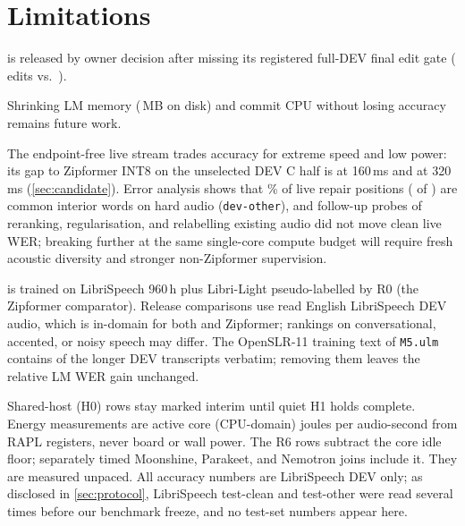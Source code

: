 \section{Limitations}\label{sec:limitations}

 \ultra{} \ReleaseVer{} is released by owner decision after missing its registered
full-DEV final edit gate (\CandFinalFullEdits{} edits vs.\ \CandGateFinalFull).

 \ColdLimitLive{} Shrinking LM memory
(\LmPackMb\,MB on disk) and commit CPU without losing accuracy remains future work.

 The endpoint-free live stream trades accuracy for extreme speed and
low power: its gap to Zipformer INT8 on the unselected DEV C half is \CandLiveLmCDelta\pp at 160\,ms
and \CandLiveLmEightCDelta\pp at 320\,ms (\cref{sec:candidate}). Error analysis shows that \VfDiagInteriorPct\%
of live repair positions (\VfDiagInterior{} of \VfDiagPositions{}) are common interior words on hard audio
(\texttt{dev-other}), and follow-up probes of reranking, regularisation, and relabelling existing audio
did not move clean live WER; breaking further at the same single-core compute budget will require fresh
acoustic diversity and stronger non-Zipformer supervision.

 \ultra{} is trained on LibriSpeech 960\,h plus Libri-Light
pseudo-labelled by R0 (the Zipformer comparator). Release comparisons use read English LibriSpeech DEV
audio, which is in-domain for both \ultra{} and Zipformer; rankings on conversational, accented, or
noisy speech may differ. The OpenSLR-11 training text of \texttt{M5.ulm} contains \LmOverlapCount{} of
the \LmOverlapOf{} longer DEV transcripts verbatim; removing them leaves the relative LM WER gain
unchanged.

 \ColdHostSentence{} \ColdSubsetSentence{}
Shared-host (H0) rows stay marked interim until quiet H1 holds complete. Energy measurements are
active core (CPU-domain) joules per audio-second from RAPL registers, never board or wall power.
The R6 rows subtract the core idle floor; separately timed Moonshine, Parakeet, and Nemotron joins
include it. They are measured unpaced. All accuracy numbers are LibriSpeech DEV only; as disclosed in
\cref{sec:protocol}, LibriSpeech test-clean and test-other were read several times before our
benchmark freeze, and no test-set numbers appear here.
